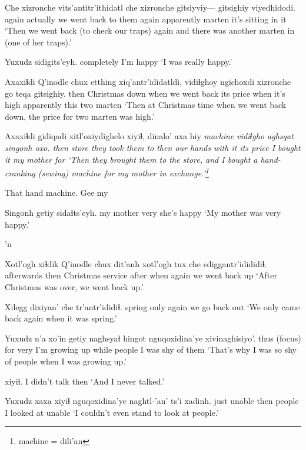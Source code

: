 \documentclass[12pt]{article}
\begin{document}
\gll Che   xizronche vits'antitr'ithidatl   che   xizronche gitsiyviy--- gitsighiy viyedhidodi.
again actually      {we went back to them} again   apparently {}         marten   {it's sitting in it}
\glt `Then we went back (to check our traps) again and there was another marten in (one of her traps).'
\glend

\gll Yuxudz     sidigits'eyh.
completely {I'm happy}
\glt `I was really happy.'
\glend

\gll Axaxiɬdi {Q'inodle chux} etthing xiq'antr'ididatldi, vidiɬghoy ngichoxdi xizronche go   teqa gitsighiy.
then   Christmas     down    {when we went back} {its price} {when it's high}  apparently          this two  marten
\glt `Then at Christmas time when we went back down, the price for two marten was high.'
\glend

\gll Axaxiɬdi gidiqadi xitl'oxiydighelo xiyiɬ, dinalo'   axa  hiy \em machine \em vidiɬgho  aghsqat  singonh      oxo.
then     store    {they took them to} then {our hands} with it   {}          {its price} {I bought it} {my mother} for
\glt `Then they brought them to the store, and I bought a hand-cranking (sewing) machine for my mother in exchange.'\footnote{machine = dili'an}
\glend

That hand machine. Gee my

\gll Singonh   getiy sidaɬts'eyh.
{my mother} very  {she's happy}
\glt `My mother was very happy.'
\glend

'n

\gll Xotl'ogh   xiɬdik  {Q'inodle chux} dit'anh xotl'ogh tux  che   ediggantr'idididiɬ.
afterwards then     Christmas       service after    when again {we went back up }
\glt `After Christmas was over, we went back up.'
\glend

\gll Xilegg dixiyan' che   tr'antr'ididiɬ.
spring only     again {we go back out}
\glt `We only came back again when it was spring.'
\glend

\gll Yuxudz n'a xo'in getiy naghsyaɬ       hingot nguqoxidina'ye xivinaghisiyo'.
thus {(focus)} for        very  {I'm growing up} while people         {I was shy of them}
\glt `That's why I was so shy of people when I was growing up.'
\glend

 xiyiɬ.
{{I didn't talk}} then
\glt `And I never talked.'
\glend

\gll Yuxudz xaxa xiyiɬ nguqoxidina'ye naghtl-'an' ts'i xadinh.
just  unable      then   people         {I looked at} {} unable
\glt `I couldn't even stand to look at people.' 
\glend
\end{document}
